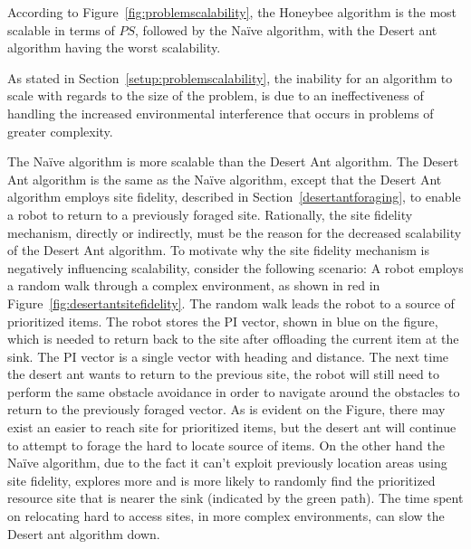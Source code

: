 According to Figure~\ref{fig:problemscalability}, the Honeybee algorithm is the most scalable in terms of $PS$, followed by the Na\"ive algorithm, with the Desert ant algorithm having the worst scalability. %

As stated in Section~\ref{setup:problemscalability}, the inability for an algorithm to scale with regards to the size of the problem, is due to an ineffectiveness of handling the increased environmental interference that occurs in problems of greater complexity.

The Na\"ive algorithm is more scalable than the Desert Ant algorithm. The Desert Ant algorithm is the same as the Na\"ive algorithm, except that the Desert Ant algorithm employs site fidelity, described in Section~\ref{desertantforaging}, to enable a robot to return to a previously foraged site. Rationally, the site fidelity mechanism, directly or indirectly, must be the reason for the decreased scalability of the Desert Ant algorithm. To motivate why the site fidelity mechanism is negatively influencing scalability, consider the following scenario: A robot employs a random walk through a complex environment, as shown in red in Figure~\ref{fig:desertantsitefidelity}. The random walk leads the robot to a source of prioritized items. The robot stores the PI vector, shown in blue on the figure, which is needed to return back to the site after offloading the current item at the sink. The PI vector is a single vector with heading and distance. The next time the desert ant wants to return to the previous site, the robot will still need to perform the same obstacle avoidance in order to navigate around the obstacles to return to the previously foraged vector. As is evident on the Figure, there may exist an easier to reach site for prioritized items, but the desert ant will continue to attempt to forage the hard to locate source of items. On the other hand the Na\"ive algorithm, due to the fact it can't exploit previously location areas using site fidelity, explores more and is more likely to randomly find the prioritized resource site that is nearer the sink (indicated by the green path). The time spent on relocating hard to access sites, in more complex environments, can slow the Desert ant algorithm down.

